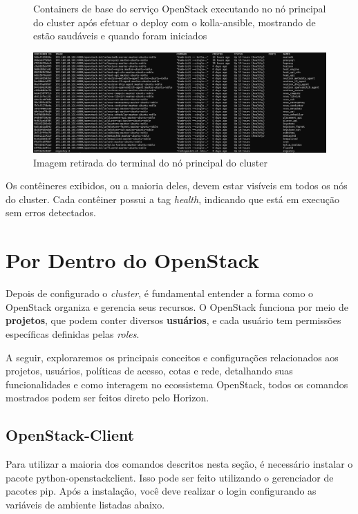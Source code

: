 \begin{figure}[htbp]
    \centering
    \caption{Containers de base do serviço OpenStack executando no nó principal do cluster após efetuar o deploy com o kolla-ansible, mostrando de estão saudáveis e quando foram iniciados}
    \includegraphics[width=1.0\textwidth]{images/controller_containers.png}
    \caption{Imagem retirada do terminal do nó principal do cluster}
    \label{fig:controller_containers}
\end{figure}

Os contêineres exibidos, ou a maioria deles, devem estar visíveis em todos os nós do cluster. Cada contêiner possui a tag \textit{health}, indicando que está em execução sem erros detectados.

\section{Por Dentro do OpenStack}
Depois de configurado o \textit{cluster}, é fundamental entender a forma como o OpenStack organiza e gerencia seus recursos. O OpenStack funciona por meio de \textbf{projetos}, que podem conter diversos \textbf{usuários}, e cada usuário tem permissões específicas definidas pelas \textit{roles}. 

A seguir, exploraremos os principais conceitos e configurações relacionados aos projetos, usuários, políticas de acesso, cotas e rede, detalhando suas funcionalidades e como interagem no ecossistema OpenStack, todos os comandos mostrados podem ser feitos direto pelo Horizon.

\subsection{OpenStack-Client}
Para utilizar a maioria dos comandos descritos nesta seção, é necessário instalar o pacote python-openstackclient. Isso pode ser feito utilizando o gerenciador de pacotes pip. Após a instalação, você deve realizar o login configurando as variáveis de ambiente listadas abaixo.

